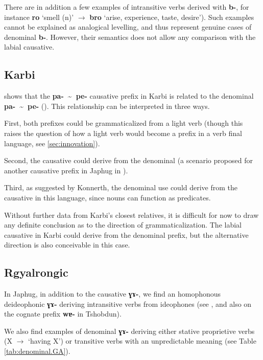 \documentclass[oneside,a4paper,11pt]{article}
\newcommand{\ipa}[1]{\textbf{{\phon\mbox{#1}}}} %
\newcommand{\forme}[2]{\ipa{#1} `#2'}
\newcommand{\tld}{\textasciitilde{}}
\begin{document}
There are in addition a few examples of intransitive verbs derived with \ipa{b-}, for  instance \forme{ro}{smell (n)} $\rightarrow$ \forme{bro}{arise, experience, taste, desire}). Such examples cannot be explained as analogical levelling, and thus represent genuine cases of denominal \ipa{b-}. However, their semantics does not allow any comparison with the labial causative.


\subsection{Karbi} \label{sec:karbi.denom}
\citet[238]{konnerth14karbi} shows that the  \ipa{pa- \tld{} pe-} causative prefix in Karbi is related to the denominal  \ipa{pa- \tld{} pe-} (\citealt[205]{konnerth14karbi}). This relationship can be interpreted in three ways. 

First, both prefixes could be grammaticalized from a light verb (though this raises the question of how a light verb would become a prefix in a verb final language, see \ref{sec:innovation}). 

Second, the causative could derive from the denominal (a scenario proposed for another causative prefix in Japhug in \citealt{jacques15causative}). 

Third, as suggested by Konnerth, the denominal use could derive from the causative in this language, since nouns can function as predicates.

Without further data from Karbi's closest relatives, it is difficult for now to draw any definite conclusion as to the direction of grammaticalization. The labial causative in Karbi could derive from the denominal prefix, but the alternative direction is also conceivable in this case.

\subsection{Rgyalrongic} \label{sec:rgyalrong.denom}
In Japhug, in addition to the causative \ipa{ɣɤ-}, we find an homophonous deideophonic \ipa{ɣɤ-} deriving intransitive verbs from ideophones (see \citealt{japhug14ideophones}, and also \citealt{jackson04zhuangmaoci, jackson14morpho} on the cognate prefix \ipa{wɐ-} in Tshobdun).

We also find examples of denominal \ipa{ɣɤ-} deriving either stative proprietive verbs (X $\rightarrow$ `having X') or transitive verbs with an unpredictable meaning (see Table \ref{tab:denominal.GA}).
\end{document}
